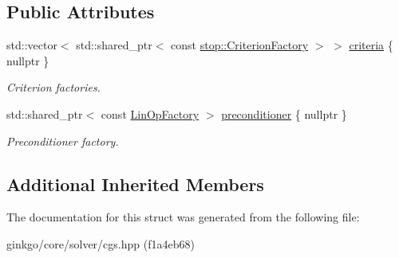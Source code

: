 \subsection*{Public Attributes}
\begin{DoxyCompactItemize}
\item 
\mbox{\label{structgko_1_1solver_1_1Cgs_1_1parameters__type_a02051dffae27205cd269beeaa29f8163}} 
std\+::vector$<$ std\+::shared\+\_\+ptr$<$ const \hyperlink{namespacegko_1_1stop_ab12a51109c50b35ec36dc5a393d6a9a0}{stop\+::\+Criterion\+Factory} $>$ $>$ \hyperlink{structgko_1_1solver_1_1Cgs_1_1parameters__type_a02051dffae27205cd269beeaa29f8163}{criteria} \{ nullptr \}
\begin{DoxyCompactList}\small\item\em Criterion factories. \end{DoxyCompactList}\item 
\mbox{\label{structgko_1_1solver_1_1Cgs_1_1parameters__type_abbe93702c7bcb93bc1d831d6b947a0f9}} 
std\+::shared\+\_\+ptr$<$ const \hyperlink{classgko_1_1LinOpFactory}{Lin\+Op\+Factory} $>$ \hyperlink{structgko_1_1solver_1_1Cgs_1_1parameters__type_abbe93702c7bcb93bc1d831d6b947a0f9}{preconditioner} \{ nullptr \}
\begin{DoxyCompactList}\small\item\em Preconditioner factory. \end{DoxyCompactList}\end{DoxyCompactItemize}
\subsection*{Additional Inherited Members}


The documentation for this struct was generated from the following file\+:\begin{DoxyCompactItemize}
\item 
ginkgo/core/solver/cgs.\+hpp (f1a4eb68)\end{DoxyCompactItemize}
